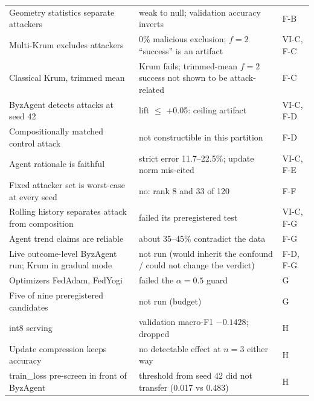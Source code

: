 \begin{table}[t]
\begin{tabularx}{\textwidth}{@{}XXl@{}}
Geometry statistics separate attackers & weak to null; validation accuracy inverts & F-B\\
Multi-Krum excludes attackers & 0\% malicious exclusion; $f=2$ ``success'' is an artifact & VI-C, F-C\\ %
Classical Krum, trimmed mean & Krum fails; trimmed-mean $f=2$ success not shown to be attack-related & F-C\\ %
ByzAgent detects attacks at seed 42 & lift $\le$ +0.05: ceiling artifact & VI-C, F-D\\ %
Compositionally matched control attack & not constructible in this partition & F-D\\
Agent rationale is faithful & strict error 11.7--22.5\%; update norm mis-cited & VI-C, F-E\\ %
Fixed attacker set is worst-case at every seed & no: rank 8 and 33 of 120 & F-F\\ %
Rolling history separates attack from composition & failed its preregistered test & VI-C, F-G\\
Agent trend claims are reliable & about 35--45\% contradict the data & F-G\\ %
Live outcome-level ByzAgent run; Krum in gradual mode & not run (would inherit the confound / could not change the verdict) & F-D, F-G\\
Optimizers FedAdam, FedYogi & failed the $\alpha=0.5$ guard & G\\ %
Five of nine preregistered candidates & not run (budget) & G\\
int8 serving & validation macro-F1 $-0.1428$; dropped & H\\ %
Update compression keeps accuracy & no detectable effect at $n=3$ either way & H\\ %
train\_loss pre-screen in front of ByzAgent & threshold from seed 42 did not transfer (0.017 vs 0.483) & H\\ %
\bottomrule
\end{tabularx}
\end{table}

